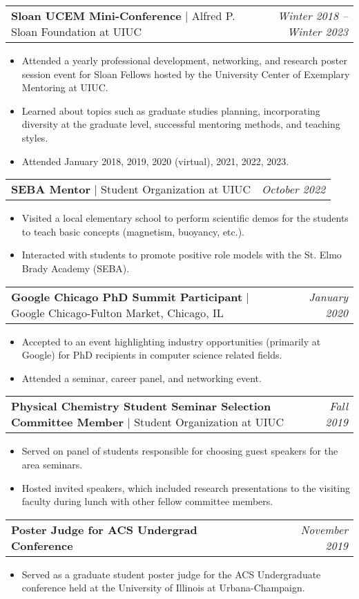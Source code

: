 \documentclass[letterpaper,10pt]{article}
\makeatletter
\newcommand{\experienceitemvspace}{3pt}
\newcommand{\resumeItem}[1]{
  \item{
    {#1 \vspace{-4pt}}
  }
}
\newcommand{\titleItem}[1]{
  \textbf{#1}
}
\newcommand{\resumeProjectHeading}[2]{
    \item
    \begin{tabular*}{0.97\textwidth}{l@{\extracolsep{\fill}}r}
      #1 & \textit{ #2} \\
    \end{tabular*}\vspace{-9pt}
}
\newcommand{\resumeItemListStart}{
\begin{itemize}}
\newcommand{\resumeItemListEnd}{
\end{itemize}\vspace{-8pt}}
\makeatother
\begin{document}
\vspace{\experienceitemvspace}
\resumeProjectHeading
{\titleItem{{Sloan UCEM Mini-Conference}} $|$ Alfred P. Sloan Foundation at UIUC}{\textcolor{color2}{Winter 2018 -- Winter 2023}}
\vspace{2pt}
\resumeItemListStart
\resumeItem{Attended a yearly professional development, networking, and research poster session event for Sloan Fellows hosted by the University Center of Exemplary Mentoring at UIUC.}
\resumeItem{Learned about topics such as graduate studies planning, incorporating diversity at the graduate level, successful mentoring methods, and teaching styles.}
\resumeItem{Attended January 2018, 2019, 2020 (virtual), 2021, 2022, 2023.}
\resumeItemListEnd

\vspace{\experienceitemvspace}
\resumeProjectHeading
{\titleItem{{SEBA Mentor}} $|$ Student Organization at UIUC}{\textcolor{color2}{October 2022}}
\vspace{2pt}
\resumeItemListStart
\resumeItem{Visited a local elementary school to perform scientific demos for the students to teach basic concepts (magnetism, buoyancy, etc.).}
\resumeItem{Interacted with students to promote positive role models with the St. Elmo Brady Academy (SEBA).}
\resumeItemListEnd

\vspace{\experienceitemvspace}
\resumeProjectHeading
{\titleItem{{Google Chicago PhD Summit Participant}} $|$ Google Chicago-Fulton Market, Chicago, IL}{\textcolor{color2}{January 2020}}
\vspace{2pt}
\resumeItemListStart
\resumeItem{Accepted to an event highlighting industry opportunities (primarily at Google) for PhD recipients in computer science related fields.}
\resumeItem{Attended a seminar, career panel, and networking event.}
\resumeItemListEnd

\vspace{\experienceitemvspace}
\resumeProjectHeading
{\titleItem{{Physical Chemistry Student Seminar Selection Committee Member}} $|$ Student Organization at UIUC}{\textcolor{color2}{Fall 2019}}
\vspace{2pt}
\resumeItemListStart
\resumeItem{Served on panel of students responsible for choosing guest speakers for the area seminars.}
\resumeItem{Hosted invited speakers, which included research presentations to the visiting faculty during lunch with other fellow committee members.}
\resumeItemListEnd

\vspace{\experienceitemvspace}
\resumeProjectHeading
{\titleItem{{Poster Judge for ACS Undergrad Conference}}} {\textcolor{color2}{November 2019}}
\vspace{2pt}
\resumeItemListStart
\resumeItem{Served as a graduate student poster judge for the ACS Undergraduate conference held at the	University of Illinois at Urbana-Champaign.}
\resumeItemListEnd
\end{document}
